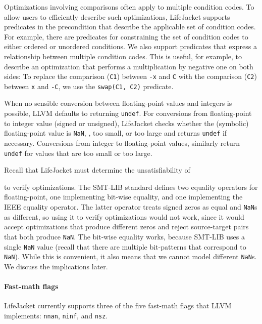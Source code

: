 \documentclass[preprint, numbers]{sigplanconf}
\newcommand{\xxx}{LifeJacket}
\begin{document}
Optimizations involving comparisons often apply to multiple condition codes. To
allow users to efficiently describe such optimizations, \xxx{} supports
predicates in the precondition that describe the applicable set of condition
codes. For example, there are predicates for constraining the set of condition
codes to either ordered or unordered conditions.  We also support predicates
that express a relationship between multiple condition codes. This is useful,
for example, to describe an optimization that performs a multiplication by
negative one on both sides: To replace the comparison (\texttt{C1}) between
\texttt{-x} and \texttt{C} with the comparison (\texttt{C2}) between \texttt{x}
and \texttt{-C}, we use the \texttt{swap(C1, C2)} predicate.

When no sensible conversion between floating-point values and integers is
possible, LLVM defaults to returning \texttt{undef}. For conversions from
floating-point to integer value (signed or unsigned), \xxx{} checks whether the
(symbolic) floating-point value is \texttt{NaN}, , too small, or too
large and returns \texttt{undef} if necessary. Conversions from integer to
floating-point values, similarly return \texttt{undef} for values that are too
small or too large.





Recall that \xxx{} must determine the unsatisfiability of

to verify optimizations. The SMT-LIB standard defines two equality operators
for floating-point, one implementing bit-wise equality, and one implementing
the IEEE equality operator. The latter operator treats signed zeros as
equal and \texttt{NaN}s as different, so using it to verify optimizations would
not work, since it would accept optimizations that produce different zeros and
reject source-target pairs that both produce \texttt{NaN}. The bit-wise
equality works, because SMT-LIB uses a single \texttt{NaN} value (recall that
there are multiple bit-patterns that correspond to \texttt{NaN}). While this
is convenient, it also means that we cannot model different \texttt{NaN}s. We
discuss the implications later.

\paragraph{Fast-math flags}
\xxx{} currently supports three of the five fast-math flags that LLVM
implements: \texttt{nnan}, \texttt{ninf}, and
\texttt{nsz}.
\end{document}
